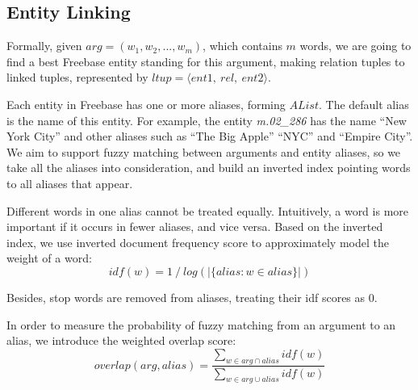 \subsection{Entity Linking}


%


Formally, given $arg=(w_1,w_2,...,w_m)$, which contains $m$ words, we are going
to find a best Freebase entity standing for this argument, making relation tuples
to linked tuples, represented by $ltup=\langle ent1,\ rel,\ ent2 \rangle$.

Each entity in Freebase has one or more aliases, forming $AList$. The default alias is the name of this entity.
For example, the entity \textit{m.02\_286} has the name ``New York City'' and other aliases
such as ``The Big Apple'' ``NYC'' and ``Empire City''.
We aim to support fuzzy matching between arguments and entity aliases,
so we take all the aliases into consideration, and build an inverted index
pointing words to all aliases that appear.

Different words in one alias cannot be treated equally. Intuitively, a word
is more important if it occurs in fewer aliases, and vice versa.
Based on the inverted index, we use inverted document frequency score to
approximately model the weight of a word:
\begin{equation}
idf(w)=1\ /\ log(|\{alias : w \in alias\}|)
\end{equation}

\noindent
Besides, stop words are removed from aliases, treating their idf scores as 0.

In order to measure the probability of fuzzy matching from an argument to an alias,
we introduce the weighted overlap score:
\begin{equation}
overlap(arg, alias) = \frac {\sum\limits_{w \in arg \cap alias} idf(w)} {\sum\limits_{w \in arg \cup alias} idf(w)}
\end{equation}

